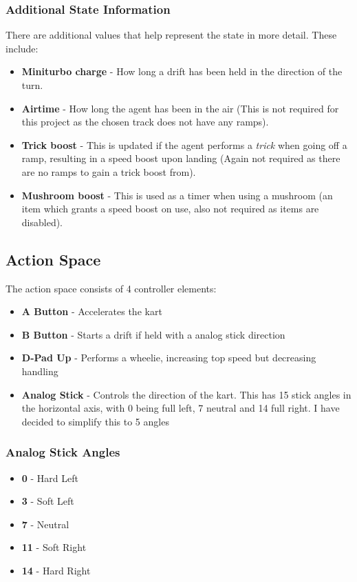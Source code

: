 \documentclass{article}
\begin{document}
\subsubsection{Additional State Information}
There are additional values that help represent the state in more detail. These include:
\begin{itemize}
    \item \textbf{Miniturbo charge} - How long a drift has been held in the direction of the turn.
    \item \textbf{Airtime} - How long the agent has been in the air (This is not required for this project as the chosen track does not have any ramps).
    \item \textbf{Trick boost} - This is updated if the agent performs a \textit{trick} when going off a ramp, resulting in a speed boost upon landing (Again not required as there are no ramps to gain a trick boost from).
    \item \textbf{Mushroom boost} - This is used as a timer when using a mushroom (an item which grants a speed boost on use, also not required as items are disabled).
\end{itemize}

\subsection{Action Space}
The action space consists of 4 controller elements:
\begin{itemize}
    \item \textbf{A Button} - Accelerates the kart
    \item \textbf{B Button} - Starts a drift if held with a analog stick direction
    \item \textbf{D-Pad Up} - Performs a wheelie, increasing top speed but decreasing handling
    \item \textbf{Analog Stick} - Controls the direction of the kart. This has 15 stick angles in the horizontal axis, with 0 being full left, 7 neutral and 14 full right. I have decided to simplify this to 5 angles
\end{itemize}
\subsubsection{Analog Stick Angles}
\begin{itemize}
    \item \textbf{0} - Hard Left
    \item \textbf{3} - Soft Left
    \item \textbf{7} - Neutral
    \item \textbf{11} - Soft Right
    \item \textbf{14} - Hard Right
\end{itemize}
\end{document}

